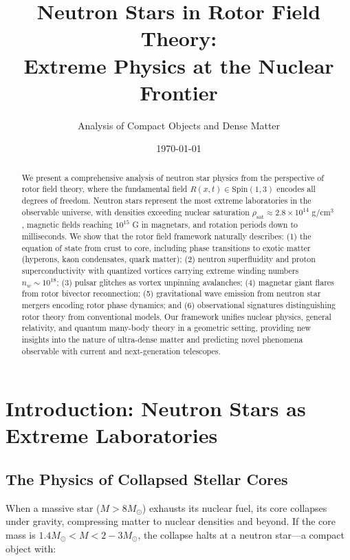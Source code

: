 \documentclass[12pt,a4paper]{article}
\title{Neutron Stars in Rotor Field Theory:\\
Extreme Physics at the Nuclear Frontier}
\author{Analysis of Compact Objects and Dense Matter}
\date{\today}
\theoremstyle{definition}
\theoremstyle{remark}
\begin{document}
\maketitle

\begin{abstract}
We present a comprehensive analysis of neutron star physics from the perspective of rotor field theory, where the fundamental field $R(x,t) \in \mathrm{Spin}(1,3)$ encodes all degrees of freedom. Neutron stars represent the most extreme laboratories in the observable universe, with densities exceeding nuclear saturation $\rho_{\text{sat}} \approx 2.8 \times 10^{14}$ g/cm$^3$, magnetic fields reaching $10^{15}$ G in magnetars, and rotation periods down to milliseconds. We show that the rotor field framework naturally describes: (1) the equation of state from crust to core, including phase transitions to exotic matter (hyperons, kaon condensates, quark matter); (2) neutron superfluidity and proton superconductivity with quantized vortices carrying extreme winding numbers $n_w \sim 10^{18}$; (3) pulsar glitches as vortex unpinning avalanches; (4) magnetar giant flares from rotor bivector reconnection; (5) gravitational wave emission from neutron star mergers encoding rotor phase dynamics; and (6) observational signatures distinguishing rotor theory from conventional models. Our framework unifies nuclear physics, general relativity, and quantum many-body theory in a geometric setting, providing new insights into the nature of ultra-dense matter and predicting novel phenomena observable with current and next-generation telescopes.
\end{abstract}

\tableofcontents
\newpage

\section{Introduction: Neutron Stars as Extreme Laboratories}

\subsection{The Physics of Collapsed Stellar Cores}

When a massive star ($M > 8 M_\odot$) exhausts its nuclear fuel, its core collapses under gravity, compressing matter to nuclear densities and beyond. If the core mass is $1.4 M_\odot < M < 2-3 M_\odot$, the collapse halts at a neutron star—a compact object with:
\end{document}
